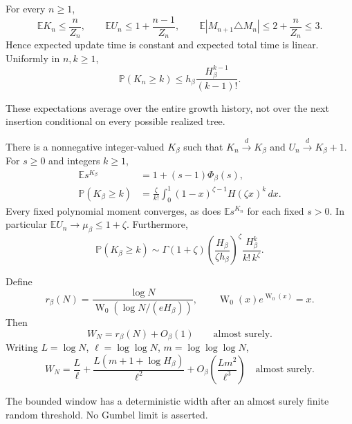 \documentclass[runningheads,envcountsame,orivec]{llncs}
\newcommand{\E}{\mathbb E}
\newcommand{\PP}{\mathbb P}
\begin{document}
\begin{theorem}\label{thm:affine}
For every $n\ge1$,
\begin{equation}\label{eq:affinemeans}
 \E K_n\le\frac n{Z_n},\qquad
 \E U_n\le1+\frac{n-1}{Z_n},\qquad
 \E|M_{n+1}\triangle M_n|\le2+\frac n{Z_n}\le3.
\end{equation}
Hence expected update time is constant and expected total time is
linear. Uniformly in $n,k\ge1$,
\begin{equation}\label{eq:factorialupper}
 \PP(K_n\ge k)\le h_\beta\frac{H_\beta^{k-1}}{(k-1)!}.
\end{equation}
\end{theorem}
These expectations average over the entire growth history, not over
the next insertion conditional on every possible realized tree.

\begin{theorem}\label{thm:affinelimit}
There is a nonnegative integer-valued $K_\beta$ such that
$K_n\xrightarrow{d}K_\beta$ and $U_n\xrightarrow{d}K_\beta+1$.
For $s\ge0$ and integers $k\ge1$,
\begin{align}
 \E s^{K_\beta}&=1+(s-1)\Phi_\beta(s),\label{eq:affinelimitpgf}\\
 \PP(K_\beta\ge k)&=\frac{\zeta}{k!}\int_0^1
 (1-x)^{\zeta-1}H(\zeta x)^k\,dx.\label{eq:affinelimittails}
\end{align}
Every fixed polynomial moment converges, as does $\E s^{K_n}$ for
each fixed $s>0$. In particular $\E U_n\to\mu_\beta\le1+\zeta$.
Furthermore,
\begin{equation}\label{eq:affinelimitsharp}
 \PP(K_\beta\ge k)\sim
 \Gamma(1+\zeta)\left(\frac{H_\beta}{\zeta h_\beta}\right)^\zeta
 \frac{H_\beta^k}{k!\,k^\zeta}.
\end{equation}
\end{theorem}

\begin{theorem}\label{thm:affinerefinedmax}
Define
\begin{equation}\label{eq:lambertcenter}
 r_\beta(N)=\frac{\log N}
 {\operatorname W_0(\log N/(eH_\beta))},\qquad
 \operatorname W_0(x)e^{\operatorname W_0(x)}=x.
\end{equation}
Then
\begin{equation}\label{eq:boundedmaximum}
 W_N=r_\beta(N)+O_\beta(1)\qquad\text{almost surely}.
\end{equation}
Writing $L=\log N$, $\ell=\log\log N$, $m=\log\log\log N$,
\begin{equation}\label{eq:secondordermaximum}
 W_N=\frac L\ell+
 \frac{L(m+1+\log H_\beta)}{\ell^2}
 +O_\beta\!\left(\frac{Lm^2}{\ell^3}\right)
 \quad\text{almost surely}.
\end{equation}
\end{theorem}
The bounded window has a deterministic width after an almost surely
finite random threshold. No Gumbel limit is asserted.
\end{document}
